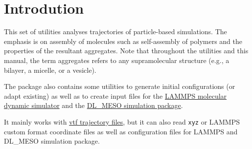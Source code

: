 \chapter{Introdution}

This set of utilities analyses trajectories of particle-based simulations.
The emphasis is on assembly of molecules such as self-assembly of polymers
and the properties of the resultant aggregates. Note that throughout the
utilities and this manual, the term aggregates refers to any supramolecular
structure (e.g., a bilayer, a micelle, or a vesicle).

The package also contains some utilities to generate initial configurations
(or adapt existing) as well as to create input files for the
\href{https://lammps.sandia.gov/}{LAMMPS molecular dynamic simulator} and
the \href{https://www.scd.stfc.ac.uk/Pages/DL_MESO.aspx}{DL\_MESO
simulation package}.

It mainly works with
\href{https://github.com/olenz/vtfplugin/wiki/VTF-format}{vtf trajectory
files}, but it can also read \texttt{xyz} or LAMMPS custom format
coordinate files as well as configuration files for LAMMPS and DL\_MESO
simulation package.

